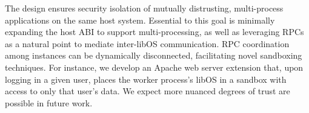 
The \sysname{} design ensures security isolation of
mutually distrusting, multi-process
applications on the same host system.
Essential to this goal is
minimally expanding the host ABI to support multi-processing,
as well as leveraging RPCs as a natural point to mediate inter-libOS communication.
RPC coordination among \sysname{} instances can be dynamically disconnected, facilitating novel sandboxing
techniques.  For instance, we develop an Apache web server extension that, upon logging in a given user,
places the worker process's libOS in a sandbox with access to only that user's data.
We expect more nuanced degrees of trust are possible in future work.

